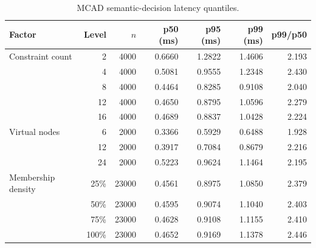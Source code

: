 \begin{table}[!t]
\centering
\caption{MCAD semantic-decision latency quantiles.}
\label{tab:latency}
\scriptsize
\begin{tabular}{@{}lrrrrrr@{}}
\toprule
Factor & Level & $n$ & p50 (ms) & p95 (ms) & p99 (ms) & p99/p50 \\
\midrule
Constraint count & 2 & 4000 & 0.6660 & 1.2822 & 1.4606 & 2.193 \\
 & 4 & 4000 & 0.5081 & 0.9555 & 1.2348 & 2.430 \\
 & 8 & 4000 & 0.4464 & 0.8285 & 0.9108 & 2.040 \\
 & 12 & 4000 & 0.4650 & 0.8795 & 1.0596 & 2.279 \\
 & 16 & 4000 & 0.4689 & 0.8837 & 1.0428 & 2.224 \\
\addlinespace
Virtual nodes & 6 & 2000 & 0.3366 & 0.5929 & 0.6488 & 1.928 \\
 & 12 & 2000 & 0.3917 & 0.7084 & 0.8679 & 2.216 \\
 & 24 & 2000 & 0.5223 & 0.9624 & 1.1464 & 2.195 \\
\addlinespace
Membership density & 25\% & 23000 & 0.4561 & 0.8975 & 1.0850 & 2.379 \\
 & 50\% & 23000 & 0.4595 & 0.9074 & 1.1040 & 2.403 \\
 & 75\% & 23000 & 0.4628 & 0.9108 & 1.1155 & 2.410 \\
 & 100\% & 23000 & 0.4652 & 0.9169 & 1.1378 & 2.446 \\
\bottomrule
\end{tabular}
\end{table}
